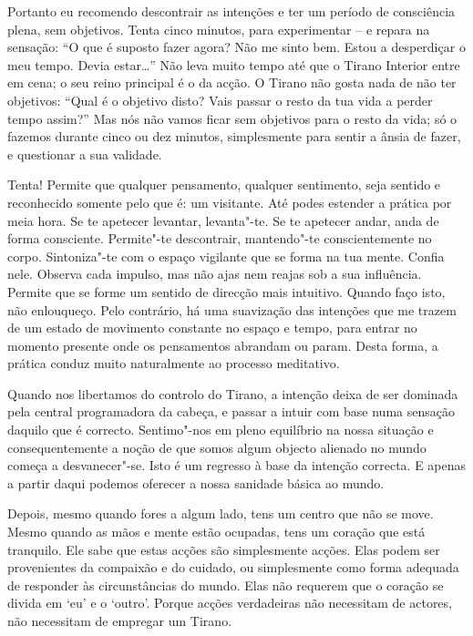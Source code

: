 Portanto eu recomendo descontrair as intenções e ter um período de
consciência plena, sem objetivos. Tenta cinco minutos, para experimentar
-- e repara na sensação: “O que é suposto fazer agora? Não me sinto bem.
Estou a desperdiçar o meu tempo. Devia estar\ldots{}” Não leva muito tempo
até que o Tirano Interior entre em cena; o seu reino principal é o da
acção. O Tirano não gosta nada de não ter objetivos: “Qual é o objetivo
disto? Vais passar o resto da tua vida a perder tempo assim?” Mas nós
não vamos ficar sem objetivos para o resto da vida; só o fazemos durante
cinco ou dez minutos, simplesmente para sentir a ânsia de fazer, e
questionar a sua validade.

\enlargethispage*{\baselineskip}

Tenta! Permite que qualquer pensamento, qualquer sentimento, seja
sentido e reconhecido somente pelo que é: um visitante. Até podes
estender a prática por meia hora. Se te apetecer levantar, levanta"-te.
Se te apetecer andar, anda de forma consciente. Permite"-te descontrair,
mantendo"-te conscientemente no corpo. Sintoniza"-te com o espaço
vigilante que se forma na tua mente. Confia nele. Observa cada impulso,
mas não ajas nem reajas sob a sua influência. Permite que se forme um
sentido de direcção mais intuitivo. Quando faço isto, não enlouqueço.
Pelo contrário, há uma suavização das intenções que me trazem de um
estado de movimento constante no espaço e tempo, para entrar no momento
presente onde os pensamentos abrandam ou param. Desta forma, a prática
conduz muito naturalmente ao processo meditativo.

\sectionBreak

\enlargethispage*{\baselineskip}

Quando nos libertamos do controlo do Tirano, a intenção deixa de ser
dominada pela central programadora da cabeça, e passar a intuir com base
numa sensação daquilo que é correcto. Sentimo"-nos em pleno equilíbrio na
nossa situação e consequentemente a noção de que somos algum objecto
alienado no mundo começa a desvanecer"-se. Isto é um regresso à base da
intenção correcta. E apenas a partir daqui podemos oferecer a nossa
sanidade básica ao mundo.

Depois, mesmo quando fores a algum lado, tens um centro que não se move.
Mesmo quando as mãos e mente estão ocupadas, tens um coração que está
tranquilo. Ele sabe que estas acções são simplesmente acções. Elas podem
ser provenientes da compaixão e do cuidado, ou simplesmente como forma
adequada de responder às circunstâncias do mundo. Elas não requerem que
o coração se divida em `eu' e o `outro'. Porque acções verdadeiras não
necessitam de actores, não necessitam de empregar um Tirano.
